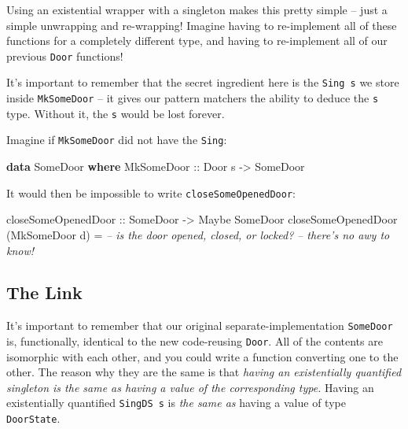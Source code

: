 \documentclass[]{article}
\newenvironment{Shaded}{}{}
\newcommand{\KeywordTok}[1]{\textcolor[rgb]{0.00,0.44,0.13}{\textbf{#1}}}
\newcommand{\DataTypeTok}[1]{\textcolor[rgb]{0.56,0.13,0.00}{#1}}
\newcommand{\CommentTok}[1]{\textcolor[rgb]{0.38,0.63,0.69}{\textit{#1}}}
\newcommand{\OtherTok}[1]{\textcolor[rgb]{0.00,0.44,0.13}{#1}}
\newcommand{\FunctionTok}[1]{\textcolor[rgb]{0.02,0.16,0.49}{#1}}
\newcommand{\NormalTok}[1]{#1}
\begin{document}
Using an existential wrapper with a singleton makes this pretty simple -- just a
simple unwrapping and re-wrapping! Imagine having to re-implement all of these
functions for a completely different type, and having to re-implement all of our
previous \texttt{Door} functions!

It's important to remember that the secret ingredient here is the
\texttt{Sing\ s} we store inside \texttt{MkSomeDoor} -- it gives our pattern
matchers the ability to deduce the \texttt{s} type. Without it, the \texttt{s}
would be lost forever.

Imagine if \texttt{MkSomeDoor} did not have the \texttt{Sing}:

\begin{Shaded}
\begin{Highlighting}[]
\KeywordTok{data} \DataTypeTok{SomeDoor} \KeywordTok{where}
    \DataTypeTok{MkSomeDoor}\OtherTok{  ::} \DataTypeTok{Door}\NormalTok{ s }\OtherTok{->} \DataTypeTok{SomeDoor}
\end{Highlighting}
\end{Shaded}

It would then be impossible to write \texttt{closeSomeOpenedDoor}:

\begin{Shaded}
\begin{Highlighting}[]
\OtherTok{closeSomeOpenedDoor ::} \DataTypeTok{SomeDoor} \OtherTok{->} \DataTypeTok{Maybe} \DataTypeTok{SomeDoor}
\NormalTok{closeSomeOpenedDoor (}\DataTypeTok{MkSomeDoor}\NormalTok{ d) }\FunctionTok{=}
            \CommentTok{-- is the door opened, closed, or locked?}
            \CommentTok{-- there's no awy to know!}
\end{Highlighting}
\end{Shaded}

\subsection{The Link}\label{the-link}

It's important to remember that our original separate-implementation
\texttt{SomeDoor} is, functionally, identical to the new code-reusing
\texttt{Door}. All of the contents are isomorphic with each other, and you could
write a function converting one to the other. The reason why they are the same
is that \emph{having an existentially quantified singleton is the same as having
a value of the corresponding type.} Having an existentially quantified
\texttt{SingDS\ s} is \emph{the same as} having a value of type
\texttt{DoorState}.
\end{document}
